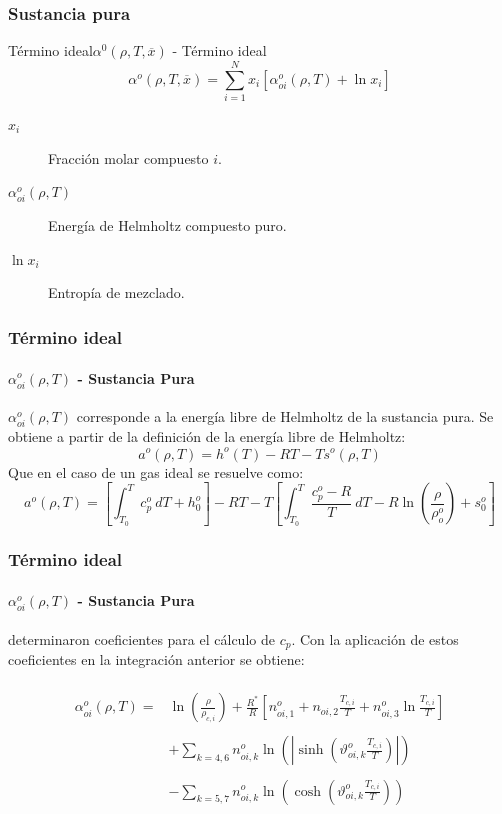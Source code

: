 \documentclass[aspectratio=1610,multi,rgb]{beamer}
\begin{document}
\subsubsection{Sustancia pura}
\begin{frame}{Término ideal}{$\alpha^0(\rho,T,\overline{x})$ -
	Término ideal}
	\begin{equation}
		\alpha^o(\rho,T,\overline{x}) = 
			\sum\limits_{i=1}^Nx_i[
				\alpha^o_{oi}(\rho,T) + \ln x_i
				]
	\end{equation}
	\begin{description}
	\item[\textbf{$x_i$}] Fracción molar compuesto $i$.
	\item[\textbf{$\alpha^o_{oi}(\rho,T)$}]
		Energía de Helmholtz compuesto 
		puro.
	\item[\textbf{$\ln x_i$}] Entropía de mezclado.
	\end{description}
\end{frame}

\begin{frame}
	\frametitle{Término ideal}
	\framesubtitle{$\alpha_{oi}^o(\rho,T)$ - Sustancia Pura}
	$\alpha_{oi}^o(\rho,T)$ corresponde a la energía libre de Helmholtz de
	la sustancia pura.
	Se obtiene a partir de la definición de la energía libre de Helmholtz:
	\begin{equation}
	a^o(\rho,T) = h^o(T)- RT - Ts^o(\rho,T)
	\end{equation}
	Que en el caso de un gas ideal se resuelve como:
	\begin{equation}
	a^o(\rho,T) = \left[\int_{{T_0}}^{{T}} {c_p^o} \: d{T} +h_0^o\right]
	 -RT - T \left[
		 \int_{{T_0}}^{{T}} {\frac{c_p^o-R}{T} } \: d{T} 
		 - R \ln \left(\frac{\rho}{\rho_o^o}\right) + s_0^o
		\right]
	\end{equation}

\end{frame}

\begin{frame}[t]
	\frametitle{Término ideal}
	\framesubtitle{$\alpha_{oi}^o(\rho,T)$ - Sustancia Pura}
	\cite{jaeschke_92} determinaron coeficientes para
	el cálculo de $c_p$. Con la aplicación de estos coeficientes en la
	integración anterior se obtiene:
	\\~\\	
	\begin{equation}
	\begin{aligned}
	\alpha_{oi}^o(\rho,T) =
		&  \ln \left(\frac{\rho}{\rho_{c,i}}\right) +
		\frac{R^*}{R} \left[n_{oi,1}^o + n_{oi,2} \frac{T_{c,i}}{T} +
		n_{oi,3}^o \ln\frac{T_{c,i}}{T}\right] \\~\\
		& + \sum\limits_{k=4,6} n_{oi,k}^o \ln
		\left(\left| \sinh
		\left(\vartheta_{oi,k}^o
			\frac{T_{c,i}}{T}
		\right) \right| \right)\\~\\
		& - \sum\limits_{k=5,7} n_{oi,k}^o \ln
		\left( \cosh
		\left(\vartheta_{oi,k}^o
			\frac{T_{c,i}}{T}
		\right) \right)\\
	\end{aligned}
	\end{equation}
\end{frame}
\end{document}
